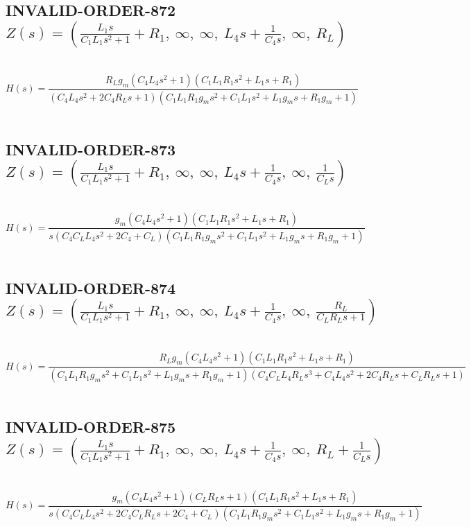 \documentclass{article}
\begin{document}
\subsection{INVALID-ORDER-872 $Z(s) = \left( \frac{L_{1} s}{C_{1} L_{1} s^{2} + 1} + R_{1}, \  \infty, \  \infty, \  L_{4} s + \frac{1}{C_{4} s}, \  \infty, \  R_{L}\right)$ } \ 
\textbf{\[H(s) = \frac{R_{L} g_{m} \left(C_{4} L_{4} s^{2} + 1\right) \left(C_{1} L_{1} R_{1} s^{2} + L_{1} s + R_{1}\right)}{\left(C_{4} L_{4} s^{2} + 2 C_{4} R_{L} s + 1\right) \left(C_{1} L_{1} R_{1} g_{m} s^{2} + C_{1} L_{1} s^{2} + L_{1} g_{m} s + R_{1} g_{m} + 1\right)}\] } \ 
\subsection{INVALID-ORDER-873 $Z(s) = \left( \frac{L_{1} s}{C_{1} L_{1} s^{2} + 1} + R_{1}, \  \infty, \  \infty, \  L_{4} s + \frac{1}{C_{4} s}, \  \infty, \  \frac{1}{C_{L} s}\right)$ } \ 
\textbf{\[H(s) = \frac{g_{m} \left(C_{4} L_{4} s^{2} + 1\right) \left(C_{1} L_{1} R_{1} s^{2} + L_{1} s + R_{1}\right)}{s \left(C_{4} C_{L} L_{4} s^{2} + 2 C_{4} + C_{L}\right) \left(C_{1} L_{1} R_{1} g_{m} s^{2} + C_{1} L_{1} s^{2} + L_{1} g_{m} s + R_{1} g_{m} + 1\right)}\] } \ 
\subsection{INVALID-ORDER-874 $Z(s) = \left( \frac{L_{1} s}{C_{1} L_{1} s^{2} + 1} + R_{1}, \  \infty, \  \infty, \  L_{4} s + \frac{1}{C_{4} s}, \  \infty, \  \frac{R_{L}}{C_{L} R_{L} s + 1}\right)$ } \ 
\textbf{\[H(s) = \frac{R_{L} g_{m} \left(C_{4} L_{4} s^{2} + 1\right) \left(C_{1} L_{1} R_{1} s^{2} + L_{1} s + R_{1}\right)}{\left(C_{1} L_{1} R_{1} g_{m} s^{2} + C_{1} L_{1} s^{2} + L_{1} g_{m} s + R_{1} g_{m} + 1\right) \left(C_{4} C_{L} L_{4} R_{L} s^{3} + C_{4} L_{4} s^{2} + 2 C_{4} R_{L} s + C_{L} R_{L} s + 1\right)}\] } \ 
\subsection{INVALID-ORDER-875 $Z(s) = \left( \frac{L_{1} s}{C_{1} L_{1} s^{2} + 1} + R_{1}, \  \infty, \  \infty, \  L_{4} s + \frac{1}{C_{4} s}, \  \infty, \  R_{L} + \frac{1}{C_{L} s}\right)$ } \ 
\textbf{\[H(s) = \frac{g_{m} \left(C_{4} L_{4} s^{2} + 1\right) \left(C_{L} R_{L} s + 1\right) \left(C_{1} L_{1} R_{1} s^{2} + L_{1} s + R_{1}\right)}{s \left(C_{4} C_{L} L_{4} s^{2} + 2 C_{4} C_{L} R_{L} s + 2 C_{4} + C_{L}\right) \left(C_{1} L_{1} R_{1} g_{m} s^{2} + C_{1} L_{1} s^{2} + L_{1} g_{m} s + R_{1} g_{m} + 1\right)}\] } \ 
\end{document}
